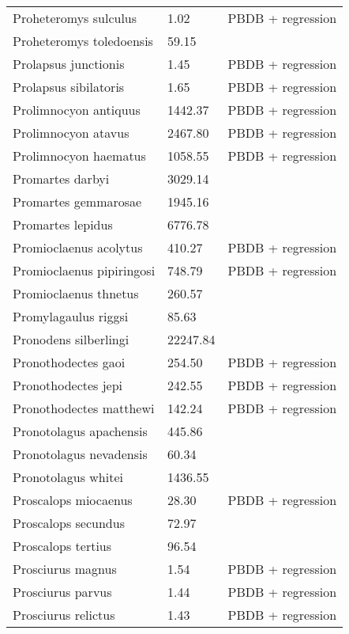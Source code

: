 \documentclass{article}
\begin{document}
\begin{center}
\begin{longtable}{p{} p{} p{}}
    Proheteromys sulculus & 1.02 & PBDB + regression \\ 
    Proheteromys toledoensis & 59.15 & \cite{Tomiya2013} \\ 
    Prolapsus junctionis & 1.45 & PBDB + regression \\ 
    Prolapsus sibilatoris & 1.65 & PBDB + regression \\ 
    Prolimnocyon antiquus & 1442.37 & PBDB + regression \\ 
    Prolimnocyon atavus & 2467.80 & PBDB + regression \\ 
    Prolimnocyon haematus & 1058.55 & PBDB + regression \\ 
    Promartes darbyi & 3029.14 & \cite{Dawson2007} \\ 
    Promartes gemmarosae & 1945.16 & \cite{Dawson2007} \\ 
    Promartes lepidus & 6776.78 & \cite{Mora2005} \\ 
    Promioclaenus acolytus & 410.27 & PBDB + regression \\ 
    Promioclaenus pipiringosi & 748.79 & PBDB + regression \\ 
    Promioclaenus thnetus & 260.57 & \cite{Gazin1930} \\ 
    Promylagaulus riggsi & 85.63 & \cite{Tomiya2013} \\ 
    Pronodens silberlingi & 22247.84 & \cite{Tomiya2013} \\ 
    Pronothodectes gaoi & 254.50 & PBDB + regression \\ 
    Pronothodectes jepi & 242.55 & PBDB + regression \\ 
    Pronothodectes matthewi & 142.24 & PBDB + regression \\ 
    Pronotolagus apachensis & 445.86 & \cite{Tomiya2013} \\ 
    Pronotolagus nevadensis & 60.34 & \cite{Tomiya2013} \\ 
    Pronotolagus whitei & 1436.55 & \cite{Tomiya2013} \\ 
    Proscalops miocaenus & 28.30 & PBDB + regression \\ 
    Proscalops secundus & 72.97 & \cite{Tomiya2013} \\ 
    Proscalops tertius & 96.54 & \cite{Tomiya2013} \\ 
    Prosciurus magnus & 1.54 & PBDB + regression \\ 
    Prosciurus parvus & 1.44 & PBDB + regression \\ 
    Prosciurus relictus & 1.43 & PBDB + regression \\ 

\end{longtable}
\end{center}
\end{document}
